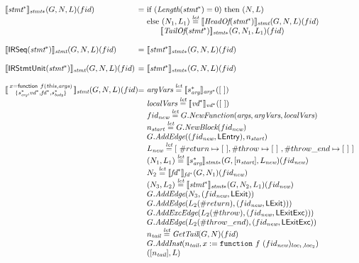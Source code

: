 \[
\begin{array}{l@{}l@{~}l}
\transfun{\emph{stmt}^*}_{\emph{stmt}*}(G,N,L)(fid) & = & 
	\mbox{if}\ (\Length(\emph{stmt}^*) = 0)\ \mbox{then}\ (N,L)\\
	& & \mbox{else}\ (N_1,L_1) \letval \transfun{\HeadOf(\emph{stmt}^*)}_{\emph{stmt}}(G,N,L)(fid)\\
	& & \phantom{else} \transfun{\TailOf(\emph{stmt}^*)}_{\emph{stmt}*}(G,N_1,L_1)(fid)\\
	& & \\

\transfun{\irseq{\emph{stmt}^*}}_{\emph{stmt}}(G,N,L)(fid) & = & 
	\transfun{\emph{stmt}^*}_{\emph{stmt}*}(G,N,L)(fid)\\
	& & \\

\transfun{\irstmtunit{\emph{stmt}^*}}_{\emph{stmt}}(G,N,L)(fid) & = & 
	\transfun{\emph{stmt}^*}_{\emph{stmt}*}(G,N,L)(fid)\\
	& & \\

\transfun{\irfunexprsmall{x}{f}{\emph{this}}{\emph{args}}{s_{\emph{arg}}^*}{\emph{vd}^*}{\emph{fd}^*}{s_{\emph{body}}^*}}_{\emph{stmt}}(G,N,L)(fid) & = &
	\argVars \letval \transfun{s_{\emph{arg}}^*}_{\emph{arg}^*}([\ ]) \\
	& & \localVars \letval \transfun{\emph{vd}^*}_{\emph{vd}^*}([\ ]) \\
	& & fid_{\emph{new}} \letval G.\emph{NewFunction}(\emph{args}, \argVars, \localVars)\\
	& & n_{\emph{start}} \letval G.\emph{NewBlock}(fid_{\emph{new}})\\
	& & G.\emph{AddEdge}((fid_{\emph{new}},\LEntry), n_{\emph{start}})\\
	& & L_{\emph{new}} \letval [\ \#return \mapsto [\ ], \#throw \mapsto [\ ]\ , \#throw\_end \mapsto [\ ]\ ] \\
	& & (N_1,L_1) \letval \transfun{s_{\emph{arg}}^*}_{\emph{stmt}*}(G,[n_{\emph{start}}],L_{\emph{new}})(fid_{\emph{new}})\\
	& & N_2 \letval \transfun{\emph{fd}^*}_{\emph{fd}^*}(G,N_1)(fid_{\emph{new}})\\
	& & (N_3,L_2) \letval \transfun{\emph{stmt}^*}_{\emph{stmt}*}(G,N_2,L_1)(fid_{\emph{new}})\\
	& & G.\emph{AddEdge}(N_3,(fid_{\emph{new}},\LExit))\\
	& & G.\emph{AddEdge}(L_2(\#return),(fid_{\emph{new}},\LExit)))\\
	& & G.\emph{AddExcEdge}(L_2(\#throw),(fid_{\emph{new}},\LExitExc)))\\
	& & G.\emph{AddEdge}(L_2(\#throw\_end),(fid_{\emph{new}},\LExitExc))\\
	& & n_{\emph{tail}} \letval \GetTail(G,N)(fid)\\
	& & G.\emph{AddInst}(n_{\emph{tail}},x := \TT{function}\ f\ (fid_{\emph{new}})_{loc_1,loc_2})\\
	& & ([n_{\emph{tail}}],L)\\
	& & \\


\end{array}\]
